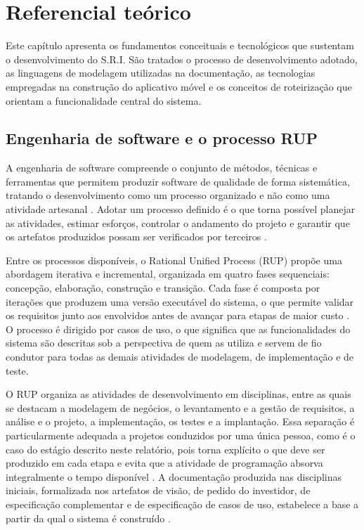 \chapter{Referencial teórico}\label{cap:referencial-teorico}

Este capítulo apresenta os fundamentos conceituais e tecnológicos que sustentam o desenvolvimento do S.R.I. São tratados o processo de desenvolvimento adotado, as linguagens de modelagem utilizadas na documentação, as tecnologias empregadas na construção do aplicativo móvel e os conceitos de roteirização que orientam a funcionalidade central do sistema.

\section{Engenharia de software e o processo RUP}

A engenharia de software compreende o conjunto de métodos, técnicas e ferramentas que permitem produzir software de qualidade de forma sistemática, tratando o desenvolvimento como um processo organizado e não como uma atividade artesanal \cite{sommerville2019}. Adotar um processo definido é o que torna possível planejar as atividades, estimar esforços, controlar o andamento do projeto e garantir que os artefatos produzidos possam ser verificados por terceiros \cite{pressman2016}.

Entre os processos disponíveis, o Rational Unified Process (RUP) propõe uma abordagem iterativa e incremental, organizada em quatro fases sequenciais: concepção, elaboração, construção e transição. Cada fase é composta por iterações que produzem uma versão executável do sistema, o que permite validar os requisitos junto aos envolvidos antes de avançar para etapas de maior custo \cite{kruchten2003}. O processo é dirigido por casos de uso, o que significa que as funcionalidades do sistema são descritas sob a perspectiva de quem as utiliza e servem de fio condutor para todas as demais atividades de modelagem, de implementação e de teste.

O RUP organiza as atividades de desenvolvimento em disciplinas, entre as quais se destacam a modelagem de negócios, o levantamento e a gestão de requisitos, a análise e o projeto, a implementação, os testes e a implantação. Essa separação é particularmente adequada a projetos conduzidos por uma única pessoa, como é o caso do estágio descrito neste relatório, pois torna explícito o que deve ser produzido em cada etapa e evita que a atividade de programação absorva integralmente o tempo disponível \cite{kruchten2003}. A documentação produzida nas disciplinas iniciais, formalizada nos artefatos de visão, de pedido do investidor, de especificação complementar e de especificação de casos de uso, estabelece a base a partir da qual o sistema é construído \cite{sriEspecComp2025}.

